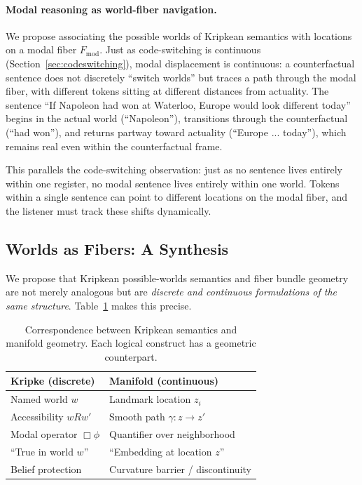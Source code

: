 \documentclass[11pt]{article}
\begin{document}
\paragraph{Modal reasoning as world-fiber navigation.}
We propose associating the possible worlds of Kripkean semantics 
\cite{kripke1963} with locations on a modal fiber $F_{\text{mod}}$. Just as code-switching is 
continuous (Section~\ref{sec:codeswitching}), modal displacement is 
continuous: a counterfactual sentence does not discretely ``switch worlds'' 
but traces a path through the modal fiber, with different tokens sitting 
at different distances from actuality. The sentence ``If Napoleon had won 
at Waterloo, Europe would look different today'' begins in the actual world 
(``Napoleon''), transitions through the counterfactual (``had won''), 
and returns partway toward actuality (``Europe ... today''), which remains 
real even within the counterfactual frame.

This parallels the code-switching observation: just as no sentence lives 
entirely within one register, no modal sentence lives entirely within one 
world. Tokens within a single sentence can point to different locations on 
the modal fiber, and the listener must track these shifts dynamically.

\subsection{Worlds as Fibers: A Synthesis}
\label{sec:kripke}

We propose that Kripkean possible-worlds semantics \cite{kripke1963} and 
fiber bundle geometry are not merely analogous but are \emph{discrete and 
continuous formulations of the same structure}. Table~\ref{tab:kripke-manifold} 
makes this precise.

\begin{table}[t]
\centering
\small
\begin{tabular}{@{}ll@{}}
\toprule
\textbf{Kripke (discrete)} & \textbf{Manifold (continuous)} \\
\midrule
Named world $w$ & Landmark location $z_i$ \\
Accessibility $wRw'$ & Smooth path $\gamma: z \to z'$ \\
Modal operator $\Box\phi$ & Quantifier over neighborhood \\
``True in world $w$'' & ``Embedding at location $z$'' \\
Belief protection & Curvature barrier / discontinuity \\
\bottomrule
\end{tabular}
\caption{Correspondence between Kripkean semantics and manifold geometry. 
Each logical construct has a geometric counterpart.}
\label{tab:kripke-manifold}
\end{table}
\end{document}
